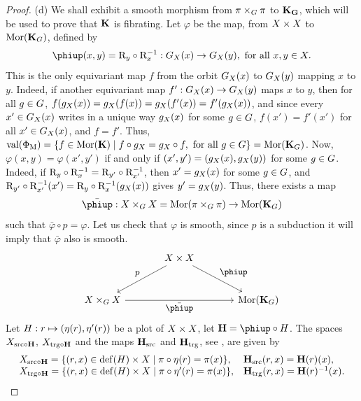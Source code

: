 \begin{proof}
  (d) We shall exhibit a smooth morphism from $\pi \times_\G \pi$ to $\KK_\GG$,
  which will be used to prove that $\KK$ is fibrating.
  Let $\varphi$ be the map,
  from $\X \times \X$ to $\Mor(\KK_\G)$,
  defined by
  $$%
  \varphi(x,y) = \eR_y \circ \eR_x^{-1} : \G_\X(x) \to \G_\X(y), \text{ for all } x,y \in \X.
  $$%
  This is the only equivariant map $f$ from the orbit $\G_\X(x)$ to $\G_\X(y)$ mapping $x$ to $y$.
  Indeed,
  if another equivariant map $f' : \G_\X(x) \to \G_\X(y)$ maps $x$ to $y$,
  then for all $g \in \G$, $f(g_\X(x)) = g_\X(f(x)) = g_\X(f'(x)) = f'(g_\X(x))$,
  and since every $x' \in \G_\X(x)$ writes in a unique way $g_\X(x)$ for some $g \in \G$, $f(x') = f'(x')$ for all $x' \in \G_\X(x)$,
  and $f =f'$.
  Thus,
  $\Val(\Phi_\eM) = \{ f \in \Mor(\KK) \mid f \circ g_\X = g_\X \circ f, \text{ for all } g \in \G\} = \Mor(\KK_\G)$.
  Now,
  $\varphi(x,y) = \varphi(x',y')$ if and only if $(x',y') = (g_\X(x),g_\X(y))$ for some $g \in \G$.
  Indeed,
  if $\eR_y \circ \eR_x^{-1} = \eR_{y'} \circ \eR_{x'}^{-1}$,
  then $x'=g_\X(x)$ for some $g \in \G$,
  and $\eR_{y'} \circ \eR_{x'}^{-1}(x') = \eR_y \circ \eR_x^{-1}(g_\X(x))$ gives $y' = g_\X(y)$.
  Thus,
  there exists a map
  $$%
  \bar\varphi : \X \times_\G \X = \Mor(\pi \times_\G \pi) \to \Mor(\KK_\G)
  $$%
  such that $\bar\varphi \circ p = \varphi$.
  Let us check that $\varphi$ is smooth,
  since $p$ is a subduction it will imply that $\bar\varphi$ also is smooth.
  \begin{equation}
    \renewcommand{\theequation}{$\clubsuit$}
    \begin{tikzcd}[column sep=large, row sep=large, every label/.append style = {font = \small}]
      {} & \X \times \X \arrow[dl, swap, "p"] \arrow[dr, "\varphi"] & {} \\
      \X \times_\G \X \arrow[rr, swap, "\bar\varphi"] & {} & \Mor(\KK_\G)
    \end{tikzcd}
  \end{equation}
  Let $\H : r \mapsto (\eta(r),\eta'(r))$ be a plot of $\X \times \X$,
  let $\HH = \varphi \circ \H$.
  The spaces $\X_{\source \circ \HH}$, $\X_{\target \circ \HH}$ and the maps $\HH_\source$ and $\HH_\target$,
  see ,
  are given by
  $$%
  \begin{array}{ll}
    \X_{\source \circ \HH} = \{ (r,x) \in \Dom(\H) \times \X \mid \pi \circ \eta(r) = \pi(x) \}, & \HH_\source (r,x) = \HH(r)(x), \\
    \X_{\target \circ \HH} = \{ (r,x) \in \Dom(\H) \times \X \mid \pi \circ \eta'(r) = \pi(x) \}, & \HH_\target (r,x) = \HH(r)^{-1}(x).

\end{array}$$
\end{proof}
